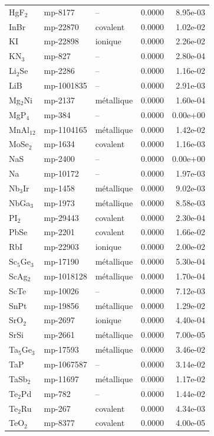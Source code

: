 \begin{longtable}{@{}l l l r r@{}}
HgF$_{2}$ & mp-8177 & -- & 0.0000 & 8.95e-03 \\
InBr & mp-22870 & covalent & 0.0000 & 1.02e-02 \\
KI & mp-22898 & ionique & 0.0000 & 2.26e-02 \\
KN$_{3}$ & mp-827 & -- & 0.0000 & 2.80e-04 \\
Li$_{2}$Se & mp-2286 & -- & 0.0000 & 1.16e-02 \\
LiB & mp-1001835 & -- & 0.0000 & 2.91e-03 \\
Mg$_{2}$Ni & mp-2137 & m\'etallique & 0.0000 & 1.60e-04 \\
MgP$_{4}$ & mp-384 & -- & 0.0000 & 0.00e+00 \\
MnAl$_{12}$ & mp-1104165 & m\'etallique & 0.0000 & 1.42e-02 \\
MoSe$_{2}$ & mp-1634 & covalent & 0.0000 & 1.16e-03 \\
NaS & mp-2400 & -- & 0.0000 & 0.00e+00 \\
Na & mp-10172 & -- & 0.0000 & 1.97e-03 \\
Nb$_{3}$Ir & mp-1458 & m\'etallique & 0.0000 & 9.02e-03 \\
NbGa$_{3}$ & mp-1973 & m\'etallique & 0.0000 & 8.58e-03 \\
PI$_{2}$ & mp-29443 & covalent & 0.0000 & 2.30e-04 \\
PbSe & mp-2201 & covalent & 0.0000 & 1.66e-02 \\
RbI & mp-22903 & ionique & 0.0000 & 2.00e-02 \\
Sc$_{5}$Ge$_{3}$ & mp-17190 & m\'etallique & 0.0000 & 5.30e-04 \\
ScAg$_{2}$ & mp-1018128 & m\'etallique & 0.0000 & 1.70e-04 \\
ScTe & mp-10026 & -- & 0.0000 & 7.12e-03 \\
SnPt & mp-19856 & m\'etallique & 0.0000 & 1.29e-02 \\
SrO$_{2}$ & mp-2697 & ionique & 0.0000 & 4.40e-04 \\
SrSi & mp-2661 & m\'etallique & 0.0000 & 7.00e-05 \\
Ta$_{5}$Ge$_{3}$ & mp-17593 & m\'etallique & 0.0000 & 3.46e-02 \\
TaP & mp-1067587 & -- & 0.0000 & 3.14e-02 \\
TaSb$_{2}$ & mp-11697 & m\'etallique & 0.0000 & 1.17e-02 \\
Te$_{2}$Pd & mp-782 & -- & 0.0000 & 1.44e-02 \\
Te$_{2}$Ru & mp-267 & covalent & 0.0000 & 4.34e-03 \\
TeO$_{2}$ & mp-8377 & covalent & 0.0000 & 4.00e-05 \\

\end{longtable}
